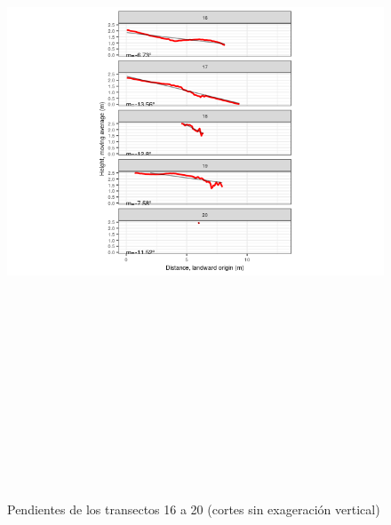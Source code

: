 \documentclass[11pt,]{article}
\begin{document}
\begin{figure}
\centering
\includegraphics[height=8.33333in]{panels-4.png}
\caption{Pendientes de los transectos 16 a 20 (cortes sin exageración
vertical) \label{transectos-perfil4}}
\end{figure}
\end{document}
